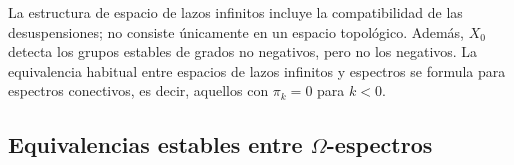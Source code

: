 \begin{nota}
La estructura de espacio de lazos infinitos incluye la compatibilidad de las desuspensiones; no consiste únicamente en un espacio topológico. Además, $X_0$ detecta los grupos estables de grados no negativos, pero no los negativos. La equivalencia habitual entre espacios de lazos infinitos y espectros se formula para espectros conectivos, es decir, aquellos con $\pi_k=0$ para $k<0$.
\end{nota}

\subsection{Equivalencias estables entre \texorpdfstring{$\Omega$}{Omega}-espectros}

